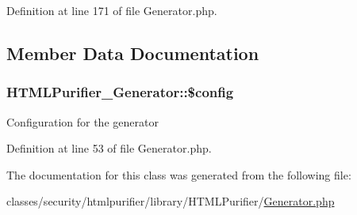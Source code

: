 Definition at line 171 of file Generator.\+php.



\subsection{Member Data Documentation}
\hypertarget{classHTMLPurifier__Generator_a42a40024d1f996b1fc78ab9f979b1801}{
\subsubsection[{\$config}]{\setlength{\rightskip}{0pt plus 5cm}H\+T\+M\+L\+Purifier\+\_\+\+Generator\+::\$config\hspace{0.3cm}{\ttfamily [protected]}}}\label{classHTMLPurifier__Generator_a42a40024d1f996b1fc78ab9f979b1801}
Configuration for the generator 

Definition at line 53 of file Generator.\+php.



The documentation for this class was generated from the following file\+:\begin{DoxyCompactItemize}
\item 
classes/security/htmlpurifier/library/\+H\+T\+M\+L\+Purifier/\hyperlink{Generator_8php}{Generator.\+php}\end{DoxyCompactItemize}
